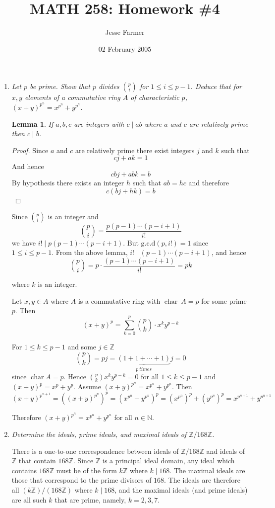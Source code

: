 \documentclass[10pt]{article}
\title{MATH 258: Homework \#4}
\author{Jesse Farmer}
\date{02 February 2005}
\newcommand{\N}{\mathbb{N}}
\newcommand{\Z}{\mathbb{Z}}
\newtheorem{lemma}{Lemma}
\begin{document}
\maketitle
\begin{enumerate}

\item \emph{Let $p$ be prime.  Show that $p$ divides $\binom{p}{i}$ for $1 \leq i \leq p-1$.  Deduce that for $x,y$ elements of a commutative ring $A$ of characteristic $p$, $(x+y)^{p^n} = x^{p^n} + y^{p^n}$.}

\begin{lemma}\label{division_lemma} If $a,b,c$ are integers with $c \mid ab$ where $a$ and $c$ are relatively prime then $c \mid b$. \end{lemma}
\begin{proof}
Since $a$ and $c$  are relatively prime there exist integers $j$ and $k$ such that $$cj + ak = 1$$  And hence $$cbj + abk = b$$  By hypothesis there exists an integer $h$ such that $ab = hc$ and therefore $$c(bj + hk) = b$$
\end{proof}

Since $\binom{p}{i}$ is an integer and $$\binom{p}{i} = \frac{p(p-1)\cdots (p-i+1)}{i!}$$ we have $i! \mid  p(p-1) \cdots (p-i+1)$.  But $\text{g.c.d}(p,i!) = 1$ since $1 \leq i \leq p-1$.  From the above lemma, $i! \mid (p-1)\cdots (p-i+1)$, and hence
\[
\binom{p}{i} = p \cdot \frac{(p-1) \cdots (p-i+1)}{i!} = pk
\]

where $k$ is an integer.

Let $x,y \in A$ where $A$ is a commutative ring with $\operatorname{char}~A = p$ for some prime $p$.  Then $$(x+y)^p = \sum_{k=0}^p \binom{p}{k} \cdot x^k y^{p-k}$$

For $1 \leq k \leq p-1$ and some $j \in \Z$ $$\binom{p}{k} = pj = \underbrace{(1+1+\cdots+1)}_{p~times}j = 0$$  since $\operatorname{char}A = p$.  Hence $\binom{p}{k}x^ky^{p-k} = 0$ for all $1 \leq k \leq p-1$ and $(x+y)^p = x^p + y^p$.  Assume $(x+y)^{p^n} = x^{p^n} + y^{p^n}$.  Then $$(x+y)^{p^{n+1}} = \left((x+y)^{p^n}\right)^p = \left(x^{p^n} + y^{p^n}\right)^p = \left(x^{p^{n}}\right)^p + \left(y^{p^{n}}\right)^p = x^{p^{n+1}} + y^{p^{n+1}}$$

Therefore $(x+y)^{p^n} = x^{p^n} + y^{p^n}$ for all $n \in \N$.

\item \emph{Determine the ideals, prime ideals, and maximal ideals of $\Z/168\Z$.}

There is a one-to-one correspondence between ideals of $\Z/168\Z$ and ideals of $\Z$ that contain $168\Z$.  Since $\Z$ is a principal ideal domain, any ideal which contains $168\Z$ must be of the form $k\Z$ where $k \mid 168$.  The maximal ideals are those that correspond to the prime divisors of $168$.  The ideals are therefore all $(k\Z)/(168\Z)$ where $k \mid 168$, and the maximal ideals (and prime ideals) are all such $k$ that are prime, namely, $k=2,3,7$.


\end{enumerate}
\end{document}
